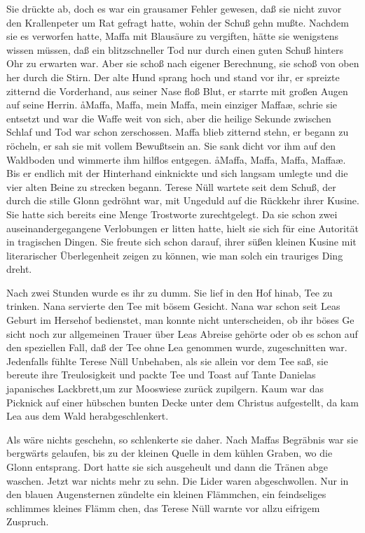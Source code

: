 Sie drückte ab, doch es war ein grausamer Fehler gewesen,
daß sie nicht zuvor den Krallenpeter um Rat gefragt hatte,
wohin der Schuß gehn mußte. Nachdem sie es verworfen
hatte, Maffa mit Blausäure zu vergiften, hätte sie wenigstens
wissen müssen, daß ein blitzschneller Tod nur durch einen guten
Schuß hinters Ohr zu erwarten war. Aber sie schoß nach eigener
Berechnung, sie schoß von oben her durch die Stirn. Der alte
Hund sprang hoch und stand vor ihr, er spreizte zitternd die
Vorderhand, aus seiner Nase floß Blut, er starrte mit großen
Augen auf seine Herrin. \aa Maffa, Maffa, mein Maffa, mein
einziger Maffa\ae, schrie sie entsetzt und war die Waffe weit
von sich, aber die heilige Sekunde zwischen Schlaf und Tod
war schon zerschossen. Maffa blieb zitternd stehn, er begann
zu röcheln, er sah sie mit vollem Bewußtsein an. Sie sank
dicht vor ihm auf den Waldboden und wimmerte ihm hilf\/los
entgegen. \aa Maffa, Maffa, Maffa, Maffa\ae. Bis er endlich mit
der Hinterhand einknickte und sich langsam umlegte und die
vier alten Beine zu strecken begann.
\abstand
Terese Nüll wartete seit dem Schuß, der durch die stille Glonn
gedröhnt war, mit Ungeduld auf die Rückkehr ihrer Kusine.
Sie hatte sich bereits eine Menge Trostworte zurechtgelegt.
Da sie schon zwei auseinandergegangene Verlobungen er\-%
litten hatte, hielt sie sich für eine Autorität in tragischen
Dingen. Sie freute sich schon darauf, ihrer süßen kleinen
Kusine mit literarischer Überlegenheit zeigen zu können,
wie man solch ein trauriges Ding dreht.

Nach zwei Stunden wurde es ihr zu dumm. Sie lief in den
Hof hinab, Tee zu trinken. Nana servierte den Tee mit bösem
Gesicht. Nana war schon seit Leas Geburt im Hersehof
bedienstet, man konnte nicht unterscheiden, ob ihr böses Ge\-%
sicht noch zur allgemeinen Trauer über Leas Abreise gehörte
oder ob es schon auf den speziellen Fall, daß der Tee ohne
Lea genommen wurde, zugeschnitten war. Jedenfalls fühlte
Terese Nüll Unbehaben, als sie allein vor dem Tee saß, sie
bereute ihre Treulosigkeit und packte Tee und Toast auf Tante
Danielas japanisches Lackbrett,um zur Mooswiese zurück\-%
zupilgern. Kaum war das Picknick auf einer hübschen bunten
Decke unter dem Christus aufgestellt, da kam Lea aus dem
Wald herabgeschlenkert.

Als wäre nichts geschehn, so schlenkerte sie daher. Nach Maffas
Begräbnis war sie bergwärts gelaufen, bis zu der kleinen
Quelle in dem kühlen Graben, wo die Glonn entsprang.
Dort hatte sie sich ausgeheult und dann die Tränen abge\-%
waschen. Jetzt war nichts mehr zu sehn. Die Lider waren
abgeschwollen. Nur in den blauen Augensternen zündelte ein
kleinen Flämmchen, ein feindseliges schlimmes kleines Flämm\-%
chen, das Terese Nüll warnte vor allzu eifrigem Zuspruch.

